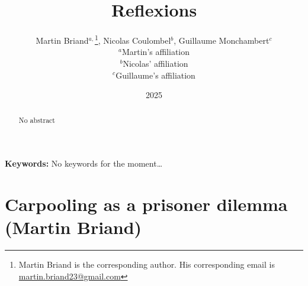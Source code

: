 \documentclass[english, a4paper]{article}
\title{Reflexions}
\author{Martin Briand$^{a,}$\footnote{Martin Briand is the corresponding author. His corresponding email is \href{mailto:martin.briand23@gmail.com}{martin.briand23@gmail.com}}, Nicolas Coulombel$^{b}$, Guillaume Monchambert$^{c}$\\
\small $^{a}$Martin’s affiliation\\
\small $^{b}$Nicolas’ affiliation\\
\small $^{c}$Guillaume’s affiliation}
\date{2025}
\newcommand{\keywords}[1]
{
    \small
    \textbf{Keywords:} #1
    \vspace{0.2cm}
}
\begin{document}
\maketitle

\begin{abstract}
    No abstract
\end{abstract}

\keywords{No keywords for the moment…}

\section{Carpooling as a prisoner dilemma (Martin Briand)}
\end{document}
